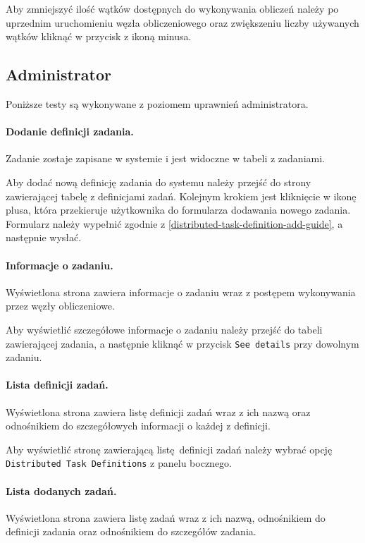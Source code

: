 \documentclass[a4paper,11pt,twoside]{report}
\theoremstyle{definition}
\begin{document}
                Aby zmniejszyć ilość wątków dostępnych do wykonywania obliczeń należy po uprzednim uruchomieniu węzła obliczeniowego oraz zwiększeniu liczby używanych wątków kliknąć w przycisk z ikoną minusa.

        \subsection{Administrator}
            Poniższe testy są wykonywane z poziomem uprawnień administratora.

            \paragraph{Dodanie definicji zadania.}   
                \noindent Zadanie zostaje zapisane w systemie i jest widoczne w tabeli z zadaniami. 

                Aby dodać nową definicję zadania do systemu należy przejść do strony zawierającej tabelę z definicjami zadań. Kolejnym krokiem jest kliknięcie w ikonę plusa, która przekieruje użytkownika do formularza dodawania nowego zadania. Formularz należy wypełnić zgodnie z \ref{distributed-task-definition-add-guide}, a następnie wysłać.

            \paragraph{Informacje o zadaniu.}    
                \noindent Wyświetlona strona zawiera informacje o zadaniu wraz z postępem wykonywania przez węzły obliczeniowe. 
                
                Aby wyświetlić szczegółowe informacje o zadaniu należy przejść do tabeli zawierającej zadania, a następnie kliknąć w przycisk \texttt{See details} przy dowolnym zadaniu.
                
            \paragraph{Lista definicji zadań.}  
                \noindent Wyświetlona strona zawiera listę definicji zadań wraz z ich nazwą oraz odnośnikiem do szczegółowych informacji o każdej z definicji.

                Aby wyświetlić stronę zawierającą listę definicji zadań należy wybrać opcję \texttt{Distributed Task Definitions} z panelu bocznego.

            \paragraph{Lista dodanych zadań.}   
                \noindent Wyświetlona strona zawiera listę zadań wraz z ich nazwą, odnośnikiem do definicji zadania oraz odnośnikiem do szczegółów zadania.
                
\end{document}
